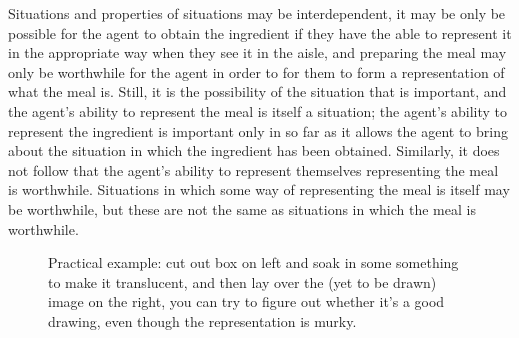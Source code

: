 \documentclass[10pt]{article}
\begin{document}
\newpage





Situations and properties of situations may be interdependent, it may be only be possible for the agent to obtain the ingredient if they have the able to represent it in the appropriate way when they see it in the aisle, and preparing the meal may only be worthwhile for the agent in order to for them to form a representation of what the meal is.
Still, it is the possibility of the situation that is important, and the agent's ability to represent the meal is itself a situation; the agent's ability to represent the ingredient is important only in so far as it allows the agent to bring about the situation in which the ingredient has been obtained.
Similarly, it does not follow that the agent's ability to represent themselves representing the meal is worthwhile.
Situations in which some way of representing the meal is itself may be worthwhile, but these are not the same as situations in which the meal is worthwhile.

\begin{figure}[t!]
  \hfill
  \begin{subfigure}{0.4\linewidth}
\end{subfigure}
\hfill
\begin{subfigure}{0.4\linewidth}
\end{subfigure}
\hfill

\caption*{Practical example: cut out box on left and soak in some something to make it translucent, and then lay over the (yet to be drawn) image on the right, you can try to figure out whether it's a good drawing, even though the representation is murky.}
\end{figure}
\end{document}
